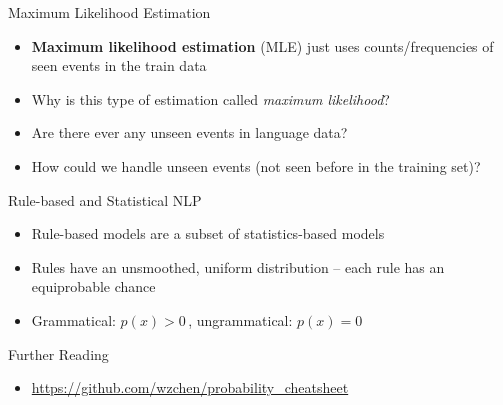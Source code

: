 \documentclass{beamer}
\begin{document}

\begin{frame}{Maximum Likelihood Estimation}
\begin{itemize}
	\item \textbf{Maximum likelihood estimation} (MLE) just uses counts/frequencies of seen events in the train data
	\item Why is this type of estimation called \textit{maximum likelihood}?
	\pause
	\item Are there ever any unseen events in language data?
	\pause
	\item How could we handle unseen events (not seen before in the training set)?
\end{itemize}
\end{frame}


\begin{frame}{Rule-based and Statistical NLP}
\begin{itemize}
	\item Rule-based models are a subset of statistics-based models
	\pause
	\item Rules have an unsmoothed, uniform distribution -- each rule has an equiprobable chance
	\pause
	\item Grammatical: $p(x) > 0$\,, ungrammatical: $p(x) = 0$
\end{itemize}
\end{frame}


\begin{frame}{Further Reading}

\begin{scriptsize}
\begin{itemize}
	\item \href{https://raw.githubusercontent.com/wzchen/probability\_cheatsheet/master/probability\_cheatsheet.pdf}{https://github.com/wzchen/probability\_cheatsheet}
\end{itemize}
\end{scriptsize}

\end{frame}

\end{document}
